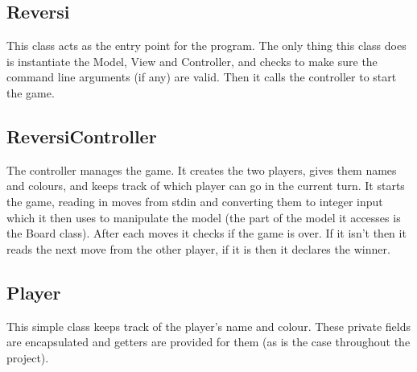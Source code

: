 \documentclass[11pt,a4paper,oneside]{report}
\begin{document}
\begin{sidewaysfigure}
\end{sidewaysfigure}

\subsection*{Reversi}
This class acts as the entry point for the program. The only thing this class does is instantiate the Model, View and Controller, and checks to make sure the command line arguments (if any) are valid. Then it calls the controller to start the game.

\subsection*{ReversiController}
The controller manages the game. It creates the two players, gives them names and colours, and keeps track of which player can go in the current turn. It starts the game, reading in moves from stdin and converting them to integer input which it then uses to manipulate the model (the part of the model it accesses is the Board class). After each moves it checks if the game is over. If it isn't then it reads the next move from the other player, if it is then it declares the winner.

\subsection*{Player}
This simple class keeps track of the player's name and colour. These private fields are encapsulated and getters are provided for them (as is the case throughout the project).
\end{document}
